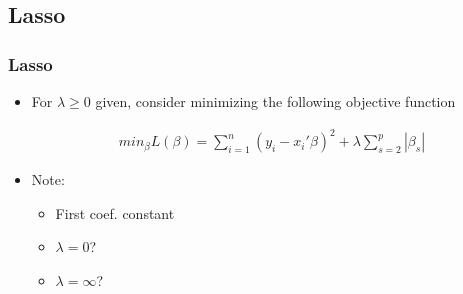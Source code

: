 \documentclass[
  shownotes,
  xcolor={svgnames},
  hyperref={colorlinks,citecolor=DarkBlue,linkcolor=DarkRed,urlcolor=DarkBlue}
  ]{beamer}
\begin{document}
\subsection{Lasso}
\begin{frame}[fragile]
\frametitle{Lasso}

\begin{itemize}
\item For $\lambda \geq 0$ given, consider minimizing the following objective function


\begin{align}
min_{\beta} L(\beta) = \sum_{i=1}^n (y_i-x_i'\beta)^2 + \lambda \sum_{s=2}^p |\beta_s| 
\end{align}

\bigskip
\item Note:
\begin{itemize}
  \item First coef. constant
  \item $\lambda = 0$?
  \item $\lambda = \infty$?
\end{itemize}
\end{itemize}
\end{frame}
\end{document}
